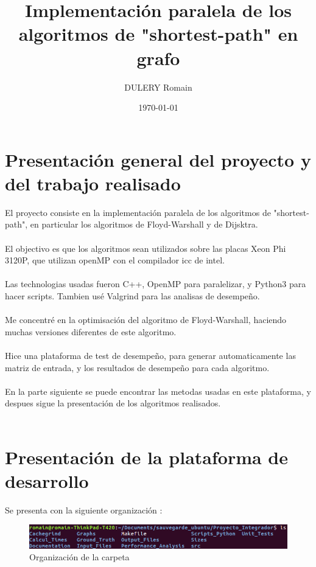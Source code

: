 \documentclass[a4paper,11pt]{article}
\title{Implementación paralela de los algoritmos de "shortest-path" en grafo}
\author{DULERY Romain}
\date{\today}
\begin{document}
\maketitle
\vspace{1cm}

\section{Presentación general del proyecto y del trabajo realisado}

El proyecto consiste en la implementación paralela de los algoritmos de "shortest-path", en particular los algoritmos de Floyd-Warshall y de Dijsktra.\\\\
El objectivo es que los algoritmos sean utilizados sobre las placas Xeon Phi 3120P, que utilizan openMP con el compilador icc de intel.\\\\
Las technologias usadas fueron C++, OpenMP para paralelizar, y Python3 para hacer scripts. Tambien usé Valgrind para las analisas de desempeño.\\\\
Me concentré en la optimisación del algoritmo de Floyd-Warshall, haciendo muchas versiones diferentes de este algoritmo.\\\\
Hice una plataforma de test de desempeño, para generar automaticamente las matriz de entrada, y los resultados de desempeño para cada algoritmo.\\\\
En la parte siguiente se puede encontrar las metodas usadas en este plataforma, y despues sigue la presentación de los algoritmos realisados.\\\\

\section{Presentación de la plataforma de desarrollo}

Se presenta con la siguiente organización :

\begin{figure}
\begin{center}
  \includegraphics[scale=0.6]{arborescence.png}
  \caption{Organización de la carpeta}
\end{center}
\end{figure}
\end{document}
